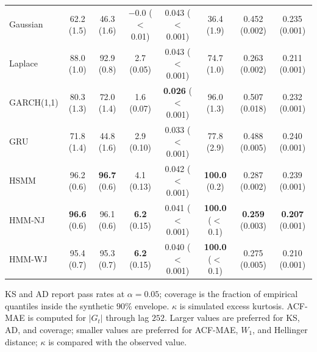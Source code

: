 \begin{table}[tbp]
{\begin{tabular}{@{}lccccccc@{}}
Gaussian  & 62.2 (1.5) & 46.3 (1.6) & $-$0.0 ($<$0.01) & 0.043 ($<$0.001) & 36.4 (1.9) & 0.452 (0.002) & 0.235 (0.001) \\
Laplace   & 88.0 (1.0) & 92.9 (0.8) & 2.7 (0.05) & 0.043 ($<$0.001) & 74.7 (1.0) & 0.263 (0.002) & 0.211 (0.001) \\
GARCH(1,1) & 80.3 (1.3) & 72.0 (1.4) & 1.6 (0.07) & \textbf{0.026} ($<$0.001) & 96.0 (1.3) & 0.507 (0.018) & 0.232 (0.001) \\
GRU       & 71.8 (1.4) & 44.8 (1.6) & 2.9 (0.10) & 0.033 ($<$0.001) & 77.8 (2.9) & 0.488 (0.005) & 0.240 (0.001) \\
HSMM      & 96.2 (0.6) & \textbf{96.7} (0.6) & 4.1 (0.13) & 0.042 ($<$0.001) & \textbf{100.0} (0.2) & 0.287 (0.002) & 0.239 (0.001) \\
HMM-NJ    & \textbf{96.6} (0.6) & 96.1 (0.6) & \textbf{6.2} (0.15) & 0.041 ($<$0.001) & \textbf{100.0} ($<$0.1) & \textbf{0.259} (0.003) & \textbf{0.207} (0.001) \\
HMM-WJ    & 95.4 (0.7) & 95.3 (0.7) & \textbf{6.2} (0.15) & 0.040 ($<$0.001) & \textbf{100.0} ($<$0.1) & 0.275 (0.005) & 0.210 (0.001) \\
\bottomrule
\end{tabular}}
\vspace{3pt}

\parbox{0.98\textwidth}{\scriptsize
KS and AD report pass rates at $\alpha=0.05$; coverage is the fraction
of empirical quantiles inside the synthetic $90\%$ envelope.
$\kappa$ is simulated excess kurtosis. ACF-MAE is computed for
$|G_t|$ through lag $252$. Larger values are preferred for KS, AD,
and coverage; smaller values are preferred for ACF-MAE, $W_1$, and
Hellinger distance; $\kappa$ is compared with the observed value.}
\end{table}
